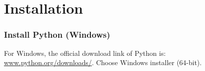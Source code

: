 \documentclass[beamer, en, version=2.0]{huangfusl-template}
\begin{document}
    \section{Installation}
    \begin{frame}[fragile]
        \frametitle{Install Python (Windows)}

        For Windows, the official download link of Python is: {\footnotesize \url{www.python.org/downloads/}}. Choose {\color{darkblue} Windows installer (64-bit)}.

    \end{frame}
\end{document}
